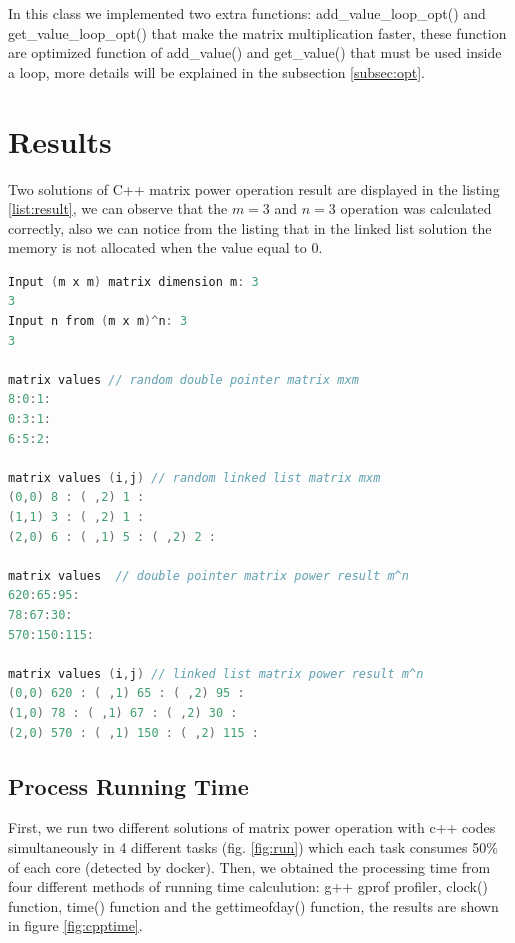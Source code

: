 \documentclass[12pt]{article}
\begin{document}
In this class we implemented two extra functions: add\_value\_loop\_opt() and get\_value\_loop\_opt() that  make the matrix multiplication faster, these function are optimized function of add\_value() and get\_value() that must be used inside a loop, more details will be explained in the subsection \ref{subsec:opt}.

    \section{Results}

    
Two solutions of C++ matrix power operation result are displayed in the listing \ref{list:result}, we can observe that the $m=3$ and $n=3$ operation was calculated correctly, also we can notice from the listing that in the linked list solution the memory is not allocated when the value equal to 0.
    \begin{lstlisting}[language=c++, caption={matrix power results}, label={list:result}]    
Input (m x m) matrix dimension m: 3
3
Input n from (m x m)^n: 3
3

matrix values // random double pointer matrix mxm
8:0:1:
0:3:1:
6:5:2:

matrix values (i,j) // random linked list matrix mxm
(0,0) 8 : ( ,2) 1 :
(1,1) 3 : ( ,2) 1 :
(2,0) 6 : ( ,1) 5 : ( ,2) 2 :

matrix values  // double pointer matrix power result m^n
620:65:95:
78:67:30:
570:150:115:

matrix values (i,j) // linked list matrix power result m^n
(0,0) 620 : ( ,1) 65 : ( ,2) 95 :
(1,0) 78 : ( ,1) 67 : ( ,2) 30 :
(2,0) 570 : ( ,1) 150 : ( ,2) 115 :
\end{lstlisting}    

    \subsection{Process Running Time}

    
First, we run two different solutions of matrix power operation with c++ codes simultaneously in 4 different tasks (fig. \ref{fig:run}) which each task consumes 50\% of each core (detected by docker). Then, we obtained the processing time from four different methods of running time calculution: g++ gprof profiler, clock() function, time() function and the gettimeofday() function, the results are shown in figure \ref{fig:cpptime}. 
\end{document}
